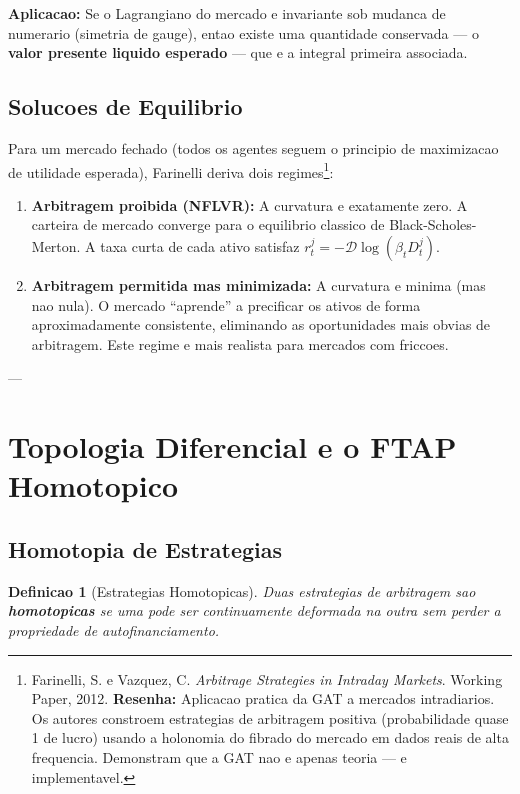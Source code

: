 \documentclass[12pt,a4paper]{article}
\newtheorem{defi}[teo]{Definicao}
\theoremstyle{remark}
\begin{document}
\textbf{Aplicacao:} Se o Lagrangiano do mercado e invariante sob mudanca de
numerario (simetria de gauge), entao existe uma quantidade conservada — o
\textbf{valor presente liquido esperado} — que e a integral primeira associada.

\subsection{Solucoes de Equilibrio}

Para um mercado fechado (todos os agentes seguem o principio de maximizacao
de utilidade esperada), Farinelli deriva dois regimes\footnote{Farinelli, S. e
Vazquez, C. \textit{Arbitrage Strategies in Intraday Markets}. Working Paper,
2012. \textbf{Resenha:} Aplicacao pratica da GAT a mercados intradiarios.
Os autores constroem estrategias de arbitragem positiva (probabilidade quase 1
de lucro) usando a holonomia do fibrado do mercado em dados reais de alta
frequencia. Demonstram que a GAT nao e apenas teoria — e implementavel.}:

\begin{enumerate}[nosep]
  \item \textbf{Arbitragem proibida (NFLVR):} A curvatura e exatamente zero.
        A carteira de mercado converge para o equilibrio classico de
        Black-Scholes-Merton. A taxa curta de cada ativo satisfaz
        $r_t^j = -\mathcal{D}\log(\beta_t D_t^j)$.

  \item \textbf{Arbitragem permitida mas minimizada:} A curvatura e minima
        (mas nao nula). O mercado ``aprende'' a precificar os ativos de forma
        aproximadamente consistente, eliminando as oportunidades mais obvias
        de arbitragem. Este regime e mais realista para mercados com friccoes.
\end{enumerate}

---

\section{Topologia Diferencial e o FTAP Homotopico}

\subsection{Homotopia de Estrategias}

\begin{defi}[Estrategias Homotopicas]
Duas estrategias de arbitragem sao \textbf{homotopicas} se uma pode ser
continuamente deformada na outra sem perder a propriedade de autofinanciamento.
\end{defi}
\end{document}
